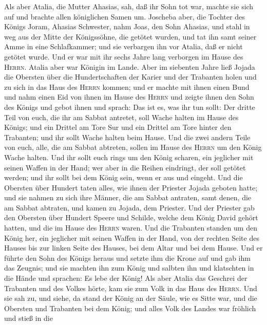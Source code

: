  Als aber Atalia, die Mutter Ahasias, sah, daß ihr Sohn
tot war, machte sie sich auf und brachte allen königlichen Samen um.
 Joscheba aber, die Tochter des Königs Joram, Ahasias
Schwester, nahm Joas, den Sohn Ahasias, und stahl in weg aus der Mitte
der Königssöhne, die getötet wurden, und tat ihn samt seiner Amme in
eine Schlafkammer; und sie verbargen ihn vor Atalia, daß er nicht
getötet wurde.  Und er war mit ihr sechs Jahre lang
verborgen im Hause des \textsc{Herrn}. Atalia aber war Königin im Lande.
 Aber im siebenten Jahre ließ Jojada die Obersten über die
Hundertschaften der Karier und der Trabanten holen und zu sich in das
Haus des \textsc{Herrn} kommen; und er machte mit ihnen einen Bund und
nahm einen Eid von ihnen im Hause des \textsc{Herrn}  und
zeigte ihnen den Sohn des Königs und gebot ihnen und sprach: Das ist es,
was ihr tun sollt: Der dritte Teil von euch, die ihr am Sabbat antretet,
soll Wache halten im Hause des Königs;  und ein Drittel am
Tore Sur und ein Drittel am Tore hinter den Trabanten; und ihr sollt
Wache halten beim Hause.  Und die zwei andern Teile von
euch, alle, die am Sabbat abtreten, sollen im Hause des \textsc{Herrn}
um den König Wache halten.  Und ihr sollt euch rings um
den König scharen, ein jeglicher mit seinen Waffen in der Hand; wer aber
in die Reihen eindringt, der soll getötet werden; und ihr sollt bei dem
König sein, wenn er aus und eingeht.  Und die Obersten
über Hundert taten alles, wie ihnen der Priester Jojada geboten hatte;
und sie nahmen zu sich ihre Männer, die am Sabbat antraten, samt denen,
die am Sabbat abtraten, und kamen zu Jojada, dem Priester.
 Und der Priester gab den Obersten über Hundert Speere
und Schilde, welche dem König David gehört hatten, und die im Hause des
\textsc{Herrn} waren.  Und die Trabanten standen um den
König her, ein jeglicher mit seinen Waffen in der Hand, von der rechten
Seite des Hauses bis zur linken Seite des Hauses, bei dem Altar und bei
dem Hause.  Und er führte den Sohn des Königs heraus und
setzte ihm die Krone auf und gab ihm das Zeugnis; und sie machten ihn
zum König und salbten ihn und klatschten in die Hände und sprachen: Es
lebe der König!  Als aber Atalia das Geschrei der
Trabanten und des Volkes hörte, kam sie zum Volk in das Haus des
\textsc{Herrn}.  Und sie sah zu, und siehe, da stand der
König an der Säule, wie es Sitte war, und die Obersten und Trabanten bei
dem König; und alles Volk des Landes war fröhlich und stieß in die
